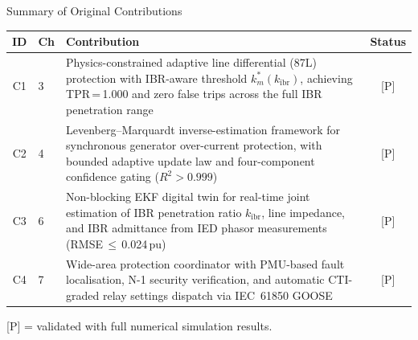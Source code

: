 \documentclass[10pt,aspectratio=169]{beamer}
\newcommand{\kibr}{k_{\mathrm{ibr}}}
\begin{document}
\begin{frame}{Summary of Original Contributions}
  \vspace{0.1cm}
  \begin{center}
  \small
  \begin{tabular}{@{}clp{7.8cm}c@{}}
    \toprule
    \textbf{ID} & \textbf{Ch} & \textbf{Contribution} & \textbf{Status} \\
    \midrule
    C1 & 3
      & Physics-constrained adaptive line differential (87L) protection
        with IBR-aware threshold $k_m^*(\kibr)$, achieving TPR\,=\,1.000
        and zero false trips across the full IBR penetration range
      & {[P]} \\[6pt]
    C2 & 4
      & Levenberg--Marquardt inverse-estimation framework for synchronous
        generator over-current protection, with bounded adaptive update law
        and four-component confidence gating ($R^2 > 0.999$)
      & {[P]} \\[6pt]
    C3 & 6
      & Non-blocking EKF digital twin for real-time joint estimation of IBR
        penetration ratio $\kibr$, line impedance, and IBR admittance from
        IED phasor measurements (RMSE\,$\leq$\,0.024\,pu)
      & {[P]} \\[6pt]
    C4 & 7
      & Wide-area protection coordinator with PMU-based fault localisation,
        N-1 security verification, and automatic CTI-graded relay settings
        dispatch via IEC~61850 GOOSE
      & {[P]} \\
    \bottomrule
  \end{tabular}
  \end{center}
  \vspace{0.15cm}
  {\footnotesize [P] = validated with full numerical simulation results.}
\end{frame}
\end{document}
